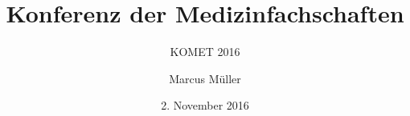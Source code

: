 %
\usepackage[ngerman]{babel}
\date{2. November 2016}
\title[KOMET 2016]{Konferenz der Medizinfachschaften}
\subtitle{KOMET 2016}
\author{Marcus Müller}

\newcommand{\GR}{{GNU\,Radio}}